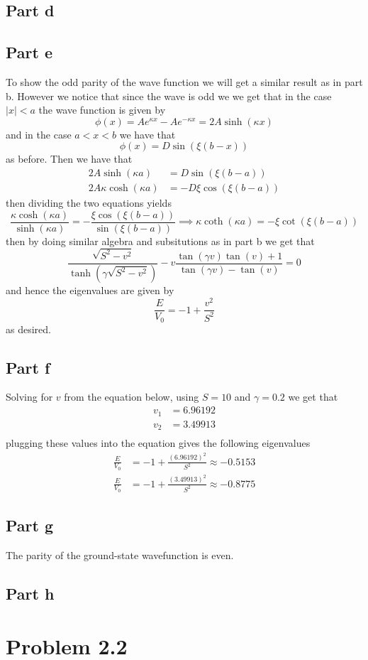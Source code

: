 \documentclass[12pt]{report}
\begin{document}
\subsection*{Part d}
\subsection*{Part e}
To show the odd parity of the wave function we will get a similar result as in part b. However we notice that since the wave is odd we we get that in the case $|x| < a$ the wave function is given by
\begin{equation*}
  \phi(x) = Ae^{\kappa x} - Ae^{-\kappa x} = 2A\sinh(\kappa x)
\end{equation*}
and in the case $a < x < b$ we have that
\begin{equation*}
    \phi(x) = D \sin(\xi (b-x))
\end{equation*}
as before. Then we have that
\begin{align*}
  2A\sinh(\kappa a) &= D \sin(\xi(b-a)) \\
  2A\kappa \cosh(\kappa a) &= -D\xi\cos(\xi(b-a))
\end{align*}
then dividing the two equations yields
\begin{equation*}
    \frac{\kappa \cosh(\kappa a)}{\sinh(\kappa a)} = -\frac{\xi \cos(\xi(b-a))}{\sin(\xi(b-a))} \implies \kappa \coth(\kappa a) = -\xi \cot(\xi(b-a))
\end{equation*}
then by doing similar algebra and subsitutions as in part b we get that
\begin{equation*}
  \frac{\sqrt{S^2 - v^2}}{\tanh(\gamma \sqrt{S^2 - v^2})} - v \frac{\tan(\gamma v)\tan(v) + 1}{\tan(\gamma v) - \tan(v)} = 0
\end{equation*}
and hence the eigenvalues are given by 
\begin{equation*}
  \frac{E}{V_0} = -1 + \frac{v^2}{S^2}
\end{equation*}
as desired.

\subsection*{Part f}
Solving for $v$ from the equation below, using $S = 10$ and $\gamma = 0.2$ we get that
\begin{align*}
  v_1 &=   6.96192 \\
  v_2 &= 3.49913 \\
\end{align*}
plugging these values into the equation gives the following eigenvalues
\begin{align*}
  \frac{E}{V_0} &= -1 + \frac{(6.96192)^2}{S^2} \approx -0.5153\\
  \frac{E}{V_0} &= -1 + \frac{(3.49913)^2}{S^2} \approx -0.8775
\end{align*}

\subsection*{Part g}
The parity of the ground-state wavefunction is even.

\subsection*{Part h}

\section*{Problem 2.2}
\end{document}
